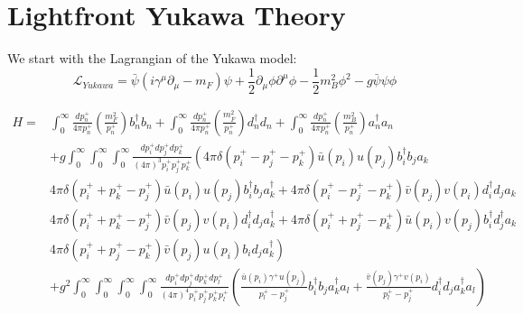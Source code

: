 \section{Lightfront Yukawa Theory}
\label{sec:yukawa-theory}
We start with the Lagrangian of the Yukawa model:
\begin{equation}
    \label{eq:yukaw-lagrangian}
    \mathcal{L}_{Yukawa} = \bar \psi \left(i\gamma^\mu \partial_\mu - m_F \right)\psi + \frac{1}{2}\partial_\mu \phi \partial^\mu \phi - \frac{1}{2}m_B^2\phi^2 - g\bar \psi \psi \phi
\end{equation}

\begin{align}
    \label{eq:yukawa-hamiltonian}
    H = & \int_0^\infty \frac{dp_n^+}{4\pi p_n^+}\left(\frac{m_F^2}{p_n^+}\right)b_n^\dagger b_n + \int_0^\infty \frac{dp_n^+}{4\pi p_n^+}\left(\frac{m_{\bar{F}}^2}{p_n^+}\right)d_n^\dagger d_n + \int_0^\infty \frac{dp_n^+}{4\pi p_n^+}\left(\frac{m_B^2}{p_n^+} \right)a_n^\dagger a_n\\ \nonumber
    & +g \int_0^\infty\int_0^\infty\int_0^\infty \frac{dp_i^+dp_j^+dp_k^+}{\left(4\pi \right)^3 p_i^+ p_j^+ p_k^+}\left(4\pi \delta\left(p_i^+ - p_j^+ - p_k^+ \right) \bar u(p_i) u(p_j)b_i^\dagger b_j a_k \right.\\ \nonumber
    &\left. 4\pi \delta\left(p_i^+ + p_k^+- p_j^+  \right) \bar u(p_i) u(p_j)b_i^\dagger b_j a_k^\dagger + 4\pi \delta\left(p_i^+ - p_j^+ - p_k^+ \right) \bar v(p_j) v(p_i)d_i^\dagger d_j a_k \right. \\ \nonumber
    &\left.  4\pi \delta\left(p_i^+ + p_k^+ - p_j^+ \right) \bar v(p_j) v(p_i)d_i^\dagger d_j a_k^\dagger + 4\pi \delta\left(p_i^+ + p_j^+ - p_k^+ \right) \bar u(p_i) v(p_j)b_i^\dagger d_j^\dagger a_k \right. \\ \nonumber
    & \left.  4\pi \delta\left(p_i^+ + p_j^+ - p_k^+ \right) \bar v(p_j) u(p_i)b_i d_j a_k^\dagger\right)\\ \nonumber
    & +g^2 \int_0^\infty\int_0^\infty\int_0^\infty \int_0^\infty\frac{dp_i^+dp_j^+dp_k^+ dp_l^+}{\left(4\pi \right)^4 p_i^+ p_j^+ p_k^+p_l^+} \left(\frac{\bar u(p_i) \gamma^+ u(p_j)}{p_l^+ - p_j^+}b_i^\dagger b_j a_k^\dagger a_l + \frac{\bar v(p_j) \gamma^+ v(p_i)}{p_l^+ - p_j^+}d_i^\dagger d_j a_k^\dagger a_l \right)\\ \nonumber
\end{align}